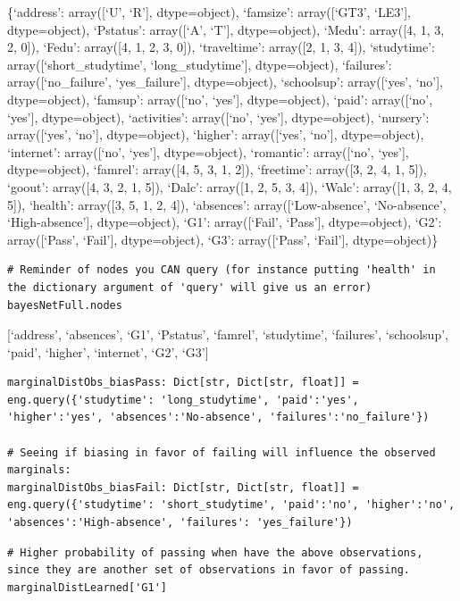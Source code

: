\documentclass[
]{article}
\begin{document}
\{`address': array({[}`U', `R'{]}, dtype=object), `famsize':
array({[}`GT3', `LE3'{]}, dtype=object), `Pstatus': array({[}`A',
`T'{]}, dtype=object), `Medu': array({[}4, 1, 3, 2, 0{]}), `Fedu':
array({[}4, 1, 2, 3, 0{]}), `traveltime': array({[}2, 1, 3, 4{]}),
`studytime': array({[}`short\_studytime', `long\_studytime'{]},
dtype=object), `failures': array({[}`no\_failure', `yes\_failure'{]},
dtype=object), `schoolsup': array({[}`yes', `no'{]}, dtype=object),
`famsup': array({[}`no', `yes'{]}, dtype=object), `paid': array({[}`no',
`yes'{]}, dtype=object), `activities': array({[}`no', `yes'{]},
dtype=object), `nursery': array({[}`yes', `no'{]}, dtype=object),
`higher': array({[}`yes', `no'{]}, dtype=object), `internet':
array({[}`no', `yes'{]}, dtype=object), `romantic': array({[}`no',
`yes'{]}, dtype=object), `famrel': array({[}4, 5, 3, 1, 2{]}),
`freetime': array({[}3, 2, 4, 1, 5{]}), `goout': array({[}4, 3, 2, 1,
5{]}), `Dalc': array({[}1, 2, 5, 3, 4{]}), `Walc': array({[}1, 3, 2, 4,
5{]}), `health': array({[}3, 5, 1, 2, 4{]}), `absences':
array({[}`Low-absence', `No-absence', `High-absence'{]}, dtype=object),
`G1': array({[}`Fail', `Pass'{]}, dtype=object), `G2': array({[}`Pass',
`Fail'{]}, dtype=object), `G3': array({[}`Pass', `Fail'{]},
dtype=object)\}

\begin{verbatim}
# Reminder of nodes you CAN query (for instance putting 'health' in the dictionary argument of 'query' will give us an error)
bayesNetFull.nodes
\end{verbatim}

{[}`address', `absences', `G1', `Pstatus', `famrel', `studytime',
`failures', `schoolsup', `paid', `higher', `internet', `G2', `G3'{]}

\begin{verbatim}
marginalDistObs_biasPass: Dict[str, Dict[str, float]] = eng.query({'studytime': 'long_studytime', 'paid':'yes', 'higher':'yes', 'absences':'No-absence', 'failures':'no_failure'})

# Seeing if biasing in favor of failing will influence the observed marginals:
marginalDistObs_biasFail: Dict[str, Dict[str, float]] = eng.query({'studytime': 'short_studytime', 'paid':'no', 'higher':'no', 'absences':'High-absence', 'failures': 'yes_failure'})
\end{verbatim}

\begin{verbatim}
# Higher probability of passing when have the above observations, since they are another set of observations in favor of passing.
marginalDistLearned['G1']
\end{verbatim}
\end{document}
